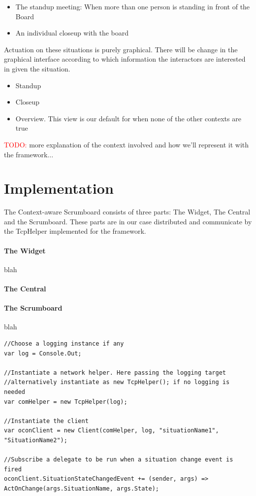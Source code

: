 \documentclass[]{report}
\newcommand\todo[1]{\textcolor{red}{TODO: }#1\PackageWarning{TODO:}{TODO tag!!}}
\begin{document}
\begin{itemize}
\item The standup meeting: When more than one person is standing in front of the Board
\item An individual closeup with the board
\end{itemize}

Actuation on these situations is purely graphical. There will be change in the graphical interface according to which information the interactors are interested in given the situation.

\begin{itemize}
\item Standup
\item Closeup
\item Overview. This view is our default for when none of the other contexts are true
\end{itemize}


\todo{more explanation of the context involved and how we'll represent it with the framework...}



\section{Implementation}

The Context-aware Scrumboard consists of three parts: The Widget, The Central and the Scrumboard. These parts are in our case distributed and communicate by the TcpHelper implemented for the framework.


\paragraph{The Widget} blah\\



\paragraph{The Central}

\paragraph{The Scrumboard} blah \\
\begin{lstlisting}
//Choose a logging instance if any
var log = Console.Out;

//Instantiate a network helper. Here passing the logging target
//alternatively instantiate as new TcpHelper(); if no logging is needed
var comHelper = new TcpHelper(log);

//Instantiate the client
var oconClient = new Client(comHelper, log, "situationName1", "SituationName2");

//Subscribe a delegate to be run when a situation change event is fired
oconClient.SituationStateChangedEvent += (sender, args) => ActOnChange(args.SituationName, args.State);
\end{lstlisting}
\end{document}
